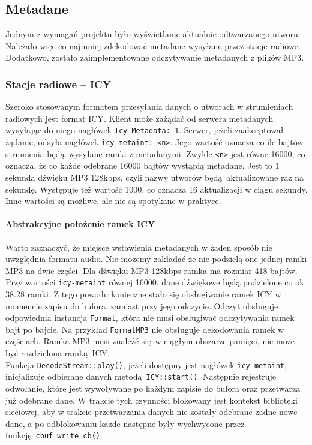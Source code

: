 \documentclass[12pt]{report}
\begin{document}
	\subsection{Metadane}
	Jednym z wymagań projektu było wyświetlanie aktualnie odtwarzanego utworu. Należało więc co najmniej zdekodować metadane wysyłane przez stacje radiowe. Dodatkowo, zostało zaimplementowane odczytywanie metadanych z plików MP3.
	
	\subsubsection{Stacje radiowe -- ICY}
		Szeroko stosowanym formatem przesyłania danych o utworach w strumieniach radiowych jest format ICY\textsuperscript{\cite{icy_spec}}. Klient może zażądać od serwera metadanych wysyłając do niego nagłówek \lstinline|Icy-Metadata: 1|. Serwer, jeżeli zaakceptował żądanie, odsyła nagłówek \lstinline|icy-metaint: <n>|. Jego wartość oznacza co ile bajtów strumienia będą wysyłane ramki z metadanymi. Zwykle \lstinline|<n>| jest równe 16000, co oznacza, że co każde odebrane 16000 bajtów wystąpią metadane. Jest to 1 sekunda dźwięku MP3 128kbps, czyli nazwy utworów będą aktualizowane raz na sekundę. Występuje też wartość 1000, co oznacza 16 aktualizacji w ciągu sekundy. Inne wartości są możliwe, ale nie są spotykane w praktyce.
		
		\paragraph{Abstrakcyjne położenie ramek ICY}
		Warto zaznaczyć, że miejsce wstawienia metadanych w żaden sposób nie uwzględnia formatu audio. Nie możemy zakładać że nie podzielą one jednej ramki MP3 na dwie części. Dla dźwięku MP3 128kbps ramka ma rozmiar 418 bajtów. Przy wartości \lstinline|icy-metaint| równej 16000, dane dźwiękowe będą podzielone co ok. $38.28$ ramki. Z tego powodu konieczne stało się obsługiwanie ramek ICY w momencie zapisu do bufora, zamiast przy jego odczycie. Odczyt obsługuje odpowiednia instancja \lstinline|Format|, która nie musi obsługiwać odczytywania ramek bajt po bajcie. Na przykład \lstinline|FormatMP3| nie obsługuje dekodowania ramek w częściach. Ramka MP3 musi znaleźć się w ciągłym obszarze pamięci, nie może być rozdzielona ramką ICY.
		$ $\\
		
		Funkcja \lstinline|DecodeStream::play()|, jeżeli dostępny jest nagłówek \lstinline|icy-metaint|, inicjalizuje odbierane danych metodą \lstinline|ICY::start()|. Następnie rejestruje odwołanie, które jest wywoływane po każdym zapisie do bufora oraz przetwarza już odebrane dane. W trakcie tych czynności blokowany jest kontekst biblioteki sieciowej, aby w trakcie przetwarzania danych nie zostały odebrane żadne nowe dane, a po odblokowaniu każde następne były wychwycone przez funkcję \lstinline|cbuf_write_cb()|.
		
\end{document}
